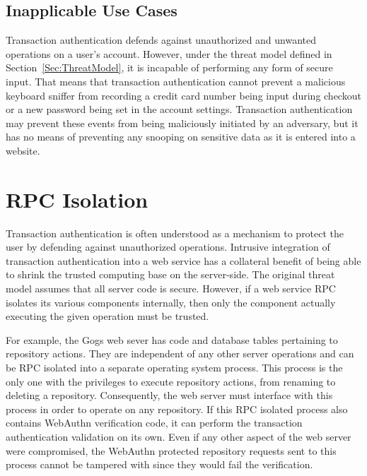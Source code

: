 
\subsection{Inapplicable Use Cases}

Transaction authentication defends against unauthorized and unwanted operations on a user's account. However, under the threat model defined in Section~\ref{Sec:ThreatModel}, it is incapable of performing any form of secure input. That means that transaction authentication cannot prevent a malicious keyboard sniffer from recording a credit card number being input during checkout or a new password being set in the account settings. Transaction authentication may prevent these events from being maliciously initiated by an adversary, but it has no means of preventing any snooping on sensitive data as it is entered into a website.

\section{RPC Isolation}

Transaction authentication is often understood as a mechanism to protect the user by defending against unauthorized operations. Intrusive integration of transaction authentication into a web service has a collateral benefit of being able to shrink the trusted computing base on the server-side. The original threat model assumes that all server code is secure. However, if a web service RPC isolates its various components internally, then only the component actually executing the given operation must be trusted. 

For example, the Gogs web sever has code and database tables pertaining to repository actions. They are independent of any other server operations and can be RPC isolated into a separate operating system process. This process is the only one with the privileges to execute repository actions, from renaming to deleting a repository. Consequently, the web server must interface with this process in order to operate on any repository. If this RPC isolated process also contains WebAuthn verification code, it can perform the transaction authentication validation on its own. Even if any other aspect of the web server were compromised, the WebAuthn protected repository requests sent to this process cannot be tampered with since they would fail the verification.

